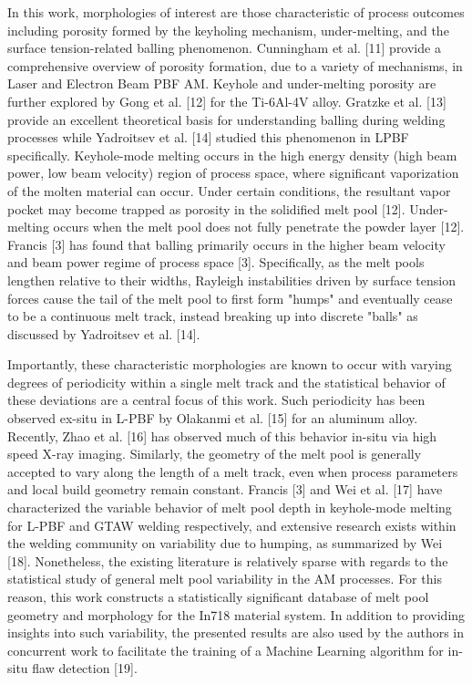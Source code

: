 \documentclass[10pt]{article}
\begin{document}
In this work, morphologies of interest are those characteristic of process outcomes including porosity formed by the keyholing mechanism, under-melting, and the surface tension-related balling phenomenon. Cunningham et al. [11] provide a comprehensive overview of porosity formation, due to a variety of mechanisms, in Laser and Electron Beam PBF AM. Keyhole and under-melting porosity are further explored by Gong et al. [12] for the Ti-6Al-4V alloy. Gratzke et al. [13] provide an excellent theoretical basis for understanding balling during welding processes while Yadroitsev et al. [14] studied this phenomenon in LPBF specifically. Keyhole-mode melting occurs in the high energy density (high beam power, low beam velocity) region of process space, where significant vaporization of the molten material can occur. Under certain conditions, the resultant vapor pocket may become trapped as porosity in the solidified melt pool [12]. Under-melting occurs when the melt pool does not fully penetrate the powder layer [12]. Francis [3] has found that balling primarily occurs in the higher beam velocity and beam power regime of process space [3]. Specifically, as the melt pools lengthen relative to their widths, Rayleigh instabilities driven by surface tension forces cause the tail of the melt pool to first form "humps" and eventually cease to be a continuous melt track, instead breaking up into discrete "balls" as discussed by Yadroitsev et al. [14].

Importantly, these characteristic morphologies are known to occur with varying degrees of periodicity within a single melt track and the statistical behavior of these deviations are a central focus of this work. Such periodicity has been observed ex-situ in L-PBF by Olakanmi et al. [15] for an aluminum alloy. Recently, Zhao et al. [16] has observed much of this behavior in-situ via high speed X-ray imaging. Similarly, the geometry of the melt pool is generally accepted to vary along the length of a melt track, even when process parameters and local build geometry remain constant. Francis [3] and Wei et al. [17] have characterized the variable behavior of melt pool depth in keyhole-mode melting for L-PBF and GTAW welding respectively, and extensive research exists within the welding community on variability due to humping, as summarized by Wei [18]. Nonetheless, the existing literature is relatively sparse with regards to the statistical study of general melt pool variability in the AM processes. For this reason, this work constructs a statistically significant database of melt pool geometry and morphology for the In718 material system. In addition to providing insights into such variability, the presented results are also used by the authors in concurrent work to facilitate the training of a Machine Learning algorithm for in-situ flaw detection [19].
\end{document}
